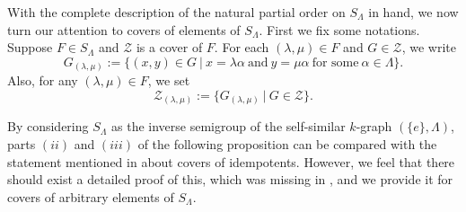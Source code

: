 \documentclass[a4paper,reqno,11pt]{amsart}
\numberwithin{equation}{section}
\theoremstyle{definition}
\theoremstyle{remark}
\begin{document}
With the complete description of the natural partial order on $S_\Lambda$ in hand, we now turn our attention to covers of elements of $S_\Lambda$. First we fix some notations. Suppose $F\in S_\Lambda$ and $\mathcal{Z}$ is a cover of $F$. For each $(\lambda,\mu)\in F$ and $G\in \mathcal{Z}$, we write \[G_{(\lambda,\mu)}:=\{(x,y)\in G~|~x=\lambda \alpha~\text{and}~y=\mu\alpha~\text{for some}~\alpha\in \Lambda\}.\] Also, for any $(\lambda,\mu)\in F$, we set \[\mathcal{Z}_{(\lambda,\mu)}:=\{G_{(\lambda,\mu)}~|~G\in \mathcal{Z}\}.\]

By considering $S_\Lambda$ as the inverse semigroup of the self-similar $k$-graph $(\{e\},\Lambda)$, parts $(ii)$ and $(iii)$ of the following proposition can be compared with the statement mentioned in \cite[Remark 4.5]{Larki} about covers of idempotents. However, we feel that there should exist a detailed proof of this, which was missing in \cite{Larki}, and we provide it for covers of arbitrary elements of $S_\Lambda$.
\end{document}
